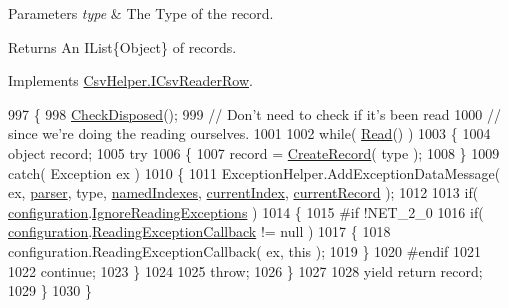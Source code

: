 \begin{DoxyParams}{Parameters}
{\em type} & The Type of the record.\\
\hline
\end{DoxyParams}
\begin{DoxyReturn}{Returns}
An I\-List\{\-Object\} of records.
\end{DoxyReturn}


Implements \hyperlink{a00091_a8f1187e434201dc22036f2f48cc4d050}{Csv\-Helper.\-I\-Csv\-Reader\-Row}.


\begin{DoxyCode}
997         \{
998             \hyperlink{a00057_a6fa45a46ed1322dc1872ca2321b5edbc}{CheckDisposed}();
999             \textcolor{comment}{// Don't need to check if it's been read}
1000             \textcolor{comment}{// since we're doing the reading ourselves.}
1001 
1002             \textcolor{keywordflow}{while}( \hyperlink{a00057_af1f0d4d722e93df9da30fe60b89ff2d6}{Read}() )
1003             \{
1004                 \textcolor{keywordtype}{object} record;
1005                 \textcolor{keywordflow}{try}
1006                 \{
1007                     record = \hyperlink{a00057_a722545ede4e575795ee9a73f6ada0ac7}{CreateRecord}( type );
1008                 \}
1009                 \textcolor{keywordflow}{catch}( Exception ex )
1010                 \{
1011                     ExceptionHelper.AddExceptionDataMessage( ex, \hyperlink{a00057_aaf2ee64c7a157027aea69bfae1fa9edc}{parser}, type, 
      \hyperlink{a00057_a3114f49bd2b3c4966f4b15a310747aeb}{namedIndexes}, \hyperlink{a00057_a56e974bc7e2242912e956393e831e166}{currentIndex}, \hyperlink{a00057_ab2bfef15784add66e441c9d3a0d73751}{currentRecord} );
1012 
1013                     \textcolor{keywordflow}{if}( \hyperlink{a00057_a695622911e45cbac8d67dcbd9a3e2967}{configuration}.\hyperlink{a00043_a8645dbd4fe2a9c443910695a93b1027f}{IgnoreReadingExceptions} )
1014                     \{
1015 \textcolor{preprocessor}{#if !NET\_2\_0
}
1016 \textcolor{preprocessor}{}                        \textcolor{keywordflow}{if}( \hyperlink{a00057_a695622911e45cbac8d67dcbd9a3e2967}{configuration}.\hyperlink{a00043_ae7257970a1b5bfb9f2ddfdc61a70fe34}{ReadingExceptionCallback} != 
      null )
1017                         \{
1018                             configuration.ReadingExceptionCallback( ex, this );
1019                         \}
1020 \textcolor{preprocessor}{#endif
}
1021 \textcolor{preprocessor}{}
1022                         \textcolor{keywordflow}{continue};
1023                     \}
1024 
1025                     \textcolor{keywordflow}{throw};
1026                 \}
1027 
1028                 yield \textcolor{keywordflow}{return} record;
1029             \}
1030         \}
\end{DoxyCode}

